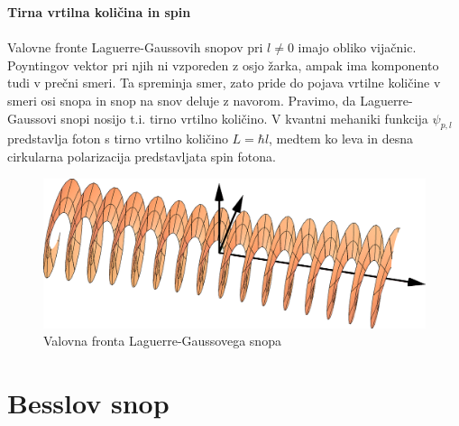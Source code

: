 \begin{remark}{{\bf Tirna vrtilna količina in spin}}\\ \\
Valovne fronte Laguerre-Gaussovih snopov pri $l\ne0$ imajo obliko vijačnic. Poyntingov 
vektor pri njih ni vzporeden z osjo žarka, ampak ima komponento tudi v prečni smeri. Ta spreminja smer, 
zato pride do pojava vrtilne količine v smeri osi snopa in snop na snov deluje z navorom. 
Pravimo, da Laguerre-Gaussovi snopi nosijo t.i. tirno vrtilno količino. 
V kvantni mehaniki funkcija $\psi_{p,l}$ predstavlja foton s tirno vrtilno količino $L = \hbar l$, 
medtem ko leva in desna cirkularna polarizacija predstavljata spin fotona. 
\begin{figure}[h]
\centering
\includegraphics[width=10truecm]{slike/03_Laguerre_faza.png}
\caption{Valovna fronta Laguerre-Gaussovega snopa}
\label{fig:Laguerrova_fronta}
\end{figure}
\end{remark}

\section{Besslov snop}

